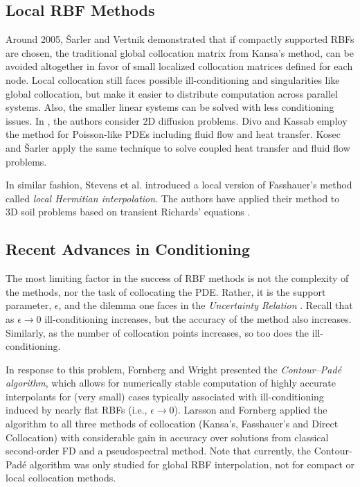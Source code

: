 \documentclass[11pt]{report}
\begin{document}
{\subsection{Local RBF Methods}
Around 2005, \v{S}arler and Vertnik \cite{Sarler2006, Vertnik2006} demonstrated that if compactly supported RBFs are chosen, the traditional global 
collocation matrix from Kansa's method, can be avoided altogether in favor of small localized collocation matrices defined for 
each node. Local collocation still faces possible ill-conditioning and singularities 
like global collocation, but make it easier to distribute computation across parallel systems. Also, the smaller linear systems can be 
solved 
with less conditioning issues. In \cite{Sarler2006}, the authors consider 2D diffusion problems. Divo and Kassab \cite{Divo2007} 
employ the 
method for Poisson-like PDEs including fluid flow and heat transfer. Kosec and \v{S}arler \cite{Kosec2008} apply the 
same technique to solve coupled heat transfer and fluid flow problems.

In similar fashion, Stevens et al. \cite{Stevens2009a} introduced a local version of 
Fasshauer's method called \emph{local Hermitian interpolation}. The authors have applied their method to 3D soil 
problems based on transient Richards' equations \cite{Stevens2008a, Stevens2009a, Stevens2009b}.


\subsection{Recent Advances in Conditioning}

The most limiting factor in the success of RBF methods is not the complexity of the methods, nor the task of collocating the PDE. Rather, it is the support parameter, $\epsilon$, and the dilemma one faces in the \emph{Uncertainty Relation} \cite{Schaback1995}. Recall that as $\epsilon \rightarrow 0$ ill-conditioning increases, but the accuracy of the method also increases. Similarly, as the number of collocation points increases, so too does the ill-conditioning. 

In response to this problem, Fornberg and Wright 
\cite{Fornberg2004} presented the \emph{Contour--Pad\'{e} algorithm}, which allows for numerically stable 
computation of highly 
accurate interpolants for (very small) cases typically associated with ill-conditioning induced by nearly flat RBFs (i.e., $\epsilon \rightarrow 0$). Larsson and Fornberg \cite{Larsson2003} 
applied the 
algorithm to all three methods of collocation (Kansa's, Fasshauer's and Direct Collocation) with considerable gain in accuracy over solutions from classical second-order FD and a pseudospectral method. %
Note that currently, the Contour-Pad\'{e} 
algorithm was only studied for global RBF interpolation, not for compact or local collocation methods. 

}
\end{document}
